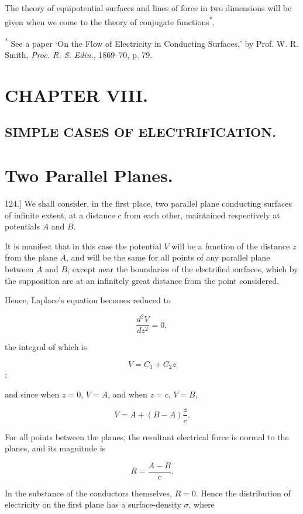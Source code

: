 \documentclass[11pt,a4paper]{article}
\begin{document}
The theory of equipotential surfaces and lines of force in two dimensions will be given when we come to the theory of conjugate functions\textsuperscript{*}.

\par\noindent\textsuperscript{*} See a paper `On the Flow of Electricity in Conducting Surfaces,' by Prof. W. R. Smith, \emph{Proc. R. S. Edin.}, 1869--70, p. 79.

\section*{CHAPTER VIII.}

\subsection*{SIMPLE CASES OF ELECTRIFICATION.}

\section*{Two Parallel Planes.}

124.] We shall consider, in the first place, two parallel plane conducting surfaces of infinite extent, at a distance $c$ from each other, maintained respectively at potentials $A$ and $B$.

It is manifest that in this case the potential $V$ will be a function of the distance $z$ from the plane $A$, and will be the same for all points of any parallel plane between $A$ and $B$, except near the boundaries of the electrified surfaces, which by the supposition are at an infinitely great distance from the point considered.

Hence, Laplace's equation becomes reduced to

\[
\frac{d^2V}{dz^2} = 0,
\]

the integral of which is

\[
V = C_1 + C_2 z
\];

and since when $z=0$, $V=A$, and when $z=c$, $V=B$,

\[
V = A + (B - A)\frac{z}{c}.
\]

For all points between the planes, the resultant electrical force is normal to the planes, and its magnitude is

\[
R = \frac{A-B}{c}.
\]

In the substance of the conductors themselves, $R=0$. Hence the distribution of electricity on the first plane has a surface-density $\sigma$, where
\end{document}
